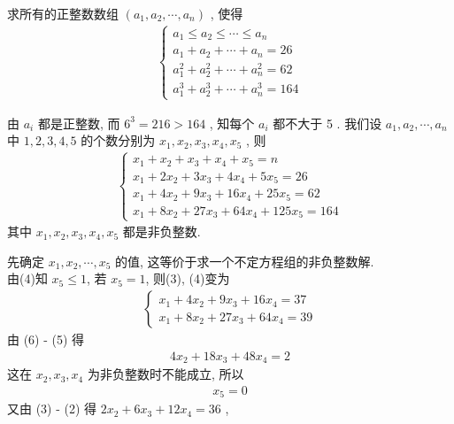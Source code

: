 \begin{example}
	求所有的正整数数组 $\left(a_{1}, a_{2}, \cdots, a_{n}\right)$ , 使得
	\begin{align*}
		\left\{\begin{array}{l}
			       a_{1} \leqslant a_{2} \leqslant \cdots \leqslant a_{n} \\
			       a_{1}+a_{2}+\cdots+a_{n}=26                            \\
			       a_{1}^{2}+a_{2}^{2}+\cdots+a_{n}^{2}=62                \\
			       a_{1}^{3}+a_{2}^{3}+\cdots+a_{n}^{3}=164
		       \end{array}\right.
	\end{align*}
\end{example}
\begin{solution}
	由 $a_{i}$ 都是正整数, 而 $6^{3}=216>164$ , 知每个 $a_{i}$ 都不大于 5 . 我们设 $a_{1}, a_{2}, \cdots, a_{n}$ 中 $1,2,3,4,5$ 的个数分别为 $x_{1}, x_{2}, x_{3}, x_{4}, x_{5}$ , 则
	\begin{align*}
		\left\{\begin{array}{l}
			       x_{1}+x_{2}+x_{3}+x_{4}+x_{5}=n            \\
			       x_{1}+2 x_{2}+3 x_{3}+4 x_{4}+5 x_{5}=26   \\
			       x_{1}+4 x_{2}+9 x_{3}+16 x_{4}+25 x_{5}=62 \\
			       x_{1}+8 x_{2}+27 x_{3}+64 x_{4}+125 x_{5}=164
		       \end{array}\right.
	\end{align*}
	其中 $x_{1}, x_{2}, x_{3}, x_{4}, x_{5}$ 都是非负整数.

	先确定 $x_{1}, x_{2}, \cdots, x_{5}$ 的值, 这等价于求一个不定方程组的非负整数解. \\
	由(4)知 $x_{5} \leqslant 1$, 若 $x_{5}=1$, 则(3), (4)变为
	\begin{align*}
		\left\{\begin{array}{l}
			       x_{1}+4 x_{2}+9 x_{3}+16 x_{4}=37 \\
			       x_{1}+8 x_{2}+27 x_{3}+64 x_{4}=39
		       \end{array}\right.
	\end{align*}
	由 (6) - (5) 得
	\begin{align*}
		4 x_{2}+18 x_{3}+48 x_{4}=2
	\end{align*}
	这在 $x_{2} ,  x_{3} ,  x_{4}$ 为非负整数时不能成立, 所以
	\begin{align*}
		x_{5}=0
	\end{align*}
	又由 (3) - (2) 得 $2 x_{2}+6 x_{3}+12 x_{4}=36$ ,


\end{solution}
